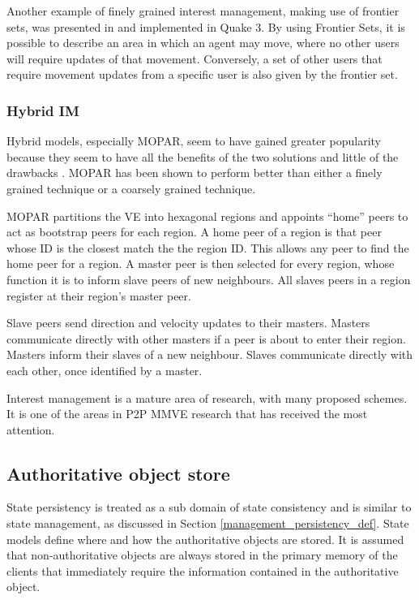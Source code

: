 Another example of finely grained interest management, making use of frontier sets, was presented in \cite{IM_frontier_sets} and implemented in Quake 3. By using Frontier Sets, it is possible to describe an area in which an agent may move, where no other users will require updates of that movement. Conversely, a set of other users that require movement updates from a specific user is also given by the frontier set.


\subsubsection{Hybrid IM}
Hybrid models, especially MOPAR, seem to have gained greater popularity because they seem to have all the benefits of the two solutions and little of the drawbacks \cite{MOPAR}. MOPAR has been shown to perform better than either a finely grained technique or a coarsely grained technique.

MOPAR partitions the VE into hexagonal regions and appoints ``home'' peers to act as bootstrap peers for each region. A home peer of a region is that peer whose ID is the closest match the the region ID. This allows any peer to find the home peer for a region. A master peer is then selected for every region, whose function it is to inform slave peers of new neighbours. All slaves peers in a region register at their region's master peer.

Slave peers send direction and velocity updates to their masters. Masters communicate directly with other masters if a peer is about to enter their region. Masters inform their slaves of a new neighbour. Slaves communicate directly with each other, once identified by a master.

Interest management is a mature area of research, with many proposed schemes. It is one of the areas in P2P MMVE research that has received the most attention.

\subsection{Authoritative object store}

State persistency is treated as a sub domain of state consistency and is similar to state management, as discussed in Section \ref{management_persistency_def}. State models define where and how the authoritative objects are stored. It is assumed that non-authoritative objects are always stored in the primary memory of the clients that immediately require the information contained in the authoritative object.


